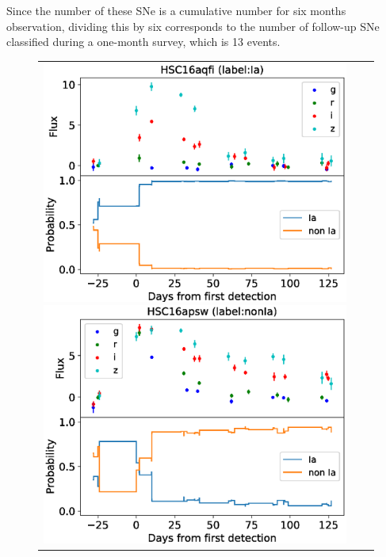 \documentclass[proof]{pasj01}
\begin{document}
Since the number of these SNe is a cumulative number for six months observation, dividing this by six corresponds to the number of follow-up SNe classified during a one-month survey, which is 13 events.
%
\begin{figure}[htbp]
    \begin{tabular}{ccc}
        \begin{minipage}{0.33\hsize}
            \begin{center}
                \includegraphics[width=\columnwidth]{figures/lcp_aqfi.eps}
            \end{center}
        \end{minipage}
        \begin{minipage}{0.33\hsize}
            \begin{center}
                \includegraphics[width=\columnwidth]{figures/lcp_apsw.eps}

\end{center}
\end{minipage}
\end{tabular}
\end{figure}
\end{document}

